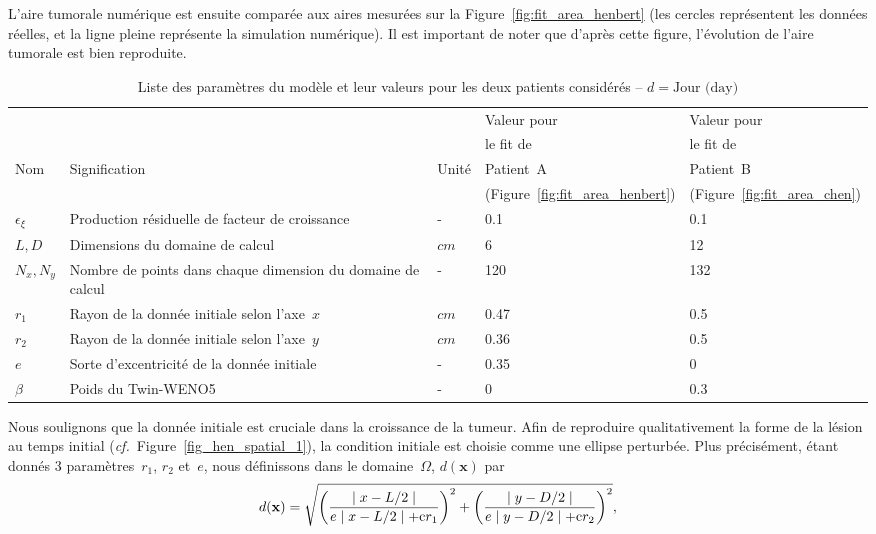 \documentclass[11pt]{amsart}
\numberwithin{equation}{section}
\newcommand{\crm}{{\rm c}}
\newcommand{\vecx}{\mathbf{x}}
\newcommand{\Twinweno}{Twin-WENO5}
\newcommand{\cf}{\textit{cf.}~}
\newcommand{\Nber}{Patient~A\xspace}
\newcommand{\Chen}{Patient~B\xspace}
\begin{document}
L'aire tumorale numérique est ensuite comparée aux aires mesurées sur la Figure~\ref{fig:fit_area_henbert} 
(les cercles représentent les données réelles, et la ligne pleine représente la simulation numérique). Il est important de noter que d'après cette 
figure, l'évolution de l'aire tumorale est bien reproduite. 
\begin{table}
{\small
\begin{tabularx}{\textwidth}{|l|X|l|p{17mm}|p{17mm}|}
\hline
\rowcolor[gray]{0.7}  & & &  Valeur pour & Valeur pour \\
\rowcolor[gray]{0.7}  & & & le fit de  & le fit de \\
\rowcolor[gray]{0.7}  Nom & Signification & Unité & \Nber & \Chen \\
\rowcolor[gray]{0.7}  &   &  & (Figure~\ref{fig:fit_area_henbert}) & (Figure~\ref{fig:fit_area_chen})\\
\hline

$\epsilon_{\xi}$ & Production résiduelle de facteur de croissance & - & 0.1 & 0.1 \\
\hline \hline \hline
$L,D$ & Dimensions du domaine de calcul &$cm$& 6 & 12 \\
$N_x,N_y$ & Nombre de points dans chaque dimension du \mbox{domaine} de calcul &-& 120 &132\\
$r_1$ & Rayon de la donnée initiale selon l'axe~$x$  & $cm$ & 0.47 & 0.5 \\
$r_2$ & Rayon de la donnée initiale selon l'axe~$y$ & $cm$ & 0.36 & 0.5 \\
$e$ & Sorte d'excentricité de la donnée initiale &-&0.35&0\\
$\beta$ & Poids du \Twinweno &-&0&0.3\\
\hline
\end{tabularx}
}
\caption{\label{table_param}Liste des paramètres du modèle et leur valeurs pour les deux patients considérés -- $d=\textrm{Jour (day)}$
}
\end{table}
Nous soulignons que la donnée initiale est cruciale dans la croissance de la tumeur. Afin de reproduire qualitativement la forme de la lésion au temps initial (\cf Figure~\ref{fig_hen_spatial_1}), 
la condition initiale est choisie comme une ellipse perturbée. 
Plus précisément, étant donnés 3 paramètres~$r_1$, $r_2$ et~$e$, nous définissons dans le domaine~$\Omega$, $d(\vecx)$ par
\begin{equation}\label{cond-ini}
d(\vecx)=\sqrt{\left(\dfrac{\mid x - L/2 \mid }{e\mid x - L/2 \mid +
      \crm r_1}\right)^2+\left(\dfrac{\mid y - D/2 \mid }{e\mid y -
      D/2 \mid + \crm r_2}\right)^2 },
\end{equation}
\end{document}
